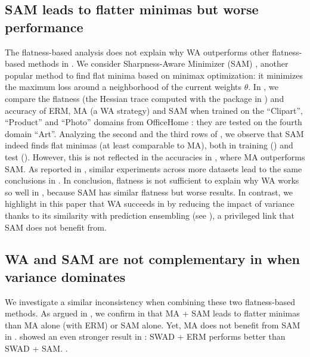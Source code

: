 \subsection{SAM leads to flatter minimas but worse \ood performance}
\label{app:mav_better_than_sam}
The flatness-based analysis does not explain why WA outperforms other flatness-based methods in \ood.
We consider Sharpness-Aware Minimizer (SAM) \cite{foret2021}, another popular method to find flat minima based on minimax optimization: it minimizes the maximum loss around a neighborhood of the current weights $\theta$.
In , we compare the flatness (\ie the Hessian trace computed with the package in \cite{yao2020pyhessian}) and accuracy of ERM, MA \cite{arpit2021ensemble} (a WA strategy) and SAM \cite{foret2021} when trained on the \enquote{Clipart}, \enquote{Product} and \enquote{Photo} domains from OfficeHome \cite{venkateswara2017deep}: they are tested \ood on the fourth domain \enquote{Art}.
Analyzing the second and the third rows of , we observe that SAM indeed finds flat minimas (at least comparable to MA), both in training (\iid) and test (\ood). However, this is not reflected in the  \ood accuracies in , where MA outperforms SAM.
As reported in , similar experiments across more datasets lead to the same conclusions in \cite{cha2021wad}.
In conclusion, flatness is not sufficient to explain why WA works so well in \ood, because SAM has similar flatness but worse \ood results.
In contrast, we highlight in this paper that WA succeeds in \ood by reducing the impact of variance thanks to its similarity with prediction ensembling \cite{Lakshminarayanan2017} (see ), a privileged link that SAM does not benefit from.%
%
\FloatBarrier
\clearpage
%

\subsection{WA and SAM are not complementary in \ood when variance dominates}%
%
\label{app:mav_sam_failure}
We investigate a similar inconsistency when combining these two flatness-based methods.
As argued in \cite{questionsflatminima22}, we confirm in  that MA + SAM leads to flatter minimas than MA alone (\ie with ERM) or SAM alone.
Yet, MA does not benefit from SAM in .
\cite{cha2021wad} showed an even stronger result in : SWAD + ERM performs better than SWAD + SAM.
.

